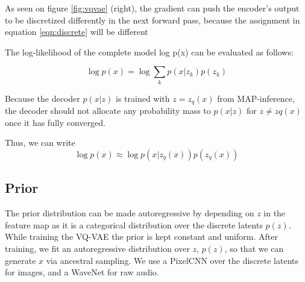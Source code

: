  As seen on figure \ref{fig:vqvae} (right), the gradient can push the encoder’s output to be discretized 
 differently in the next forward pass, because the assignment in equation \ref{eqn:discrete} will be different

 The log-likelihood of the complete model log p(x) can be evaluated as follows:

 \begin{equation}
     \log p(x) = \log \sum _k p(x|z _k) p(z _k)
     \label{eqn:modellog}
 \end{equation}

 Because the decoder $p(x|z)$ is trained with $z = z _q(x)$ from MAP-inference, the decoder
  should not allocate any probability mass to $p(x|z)$ for $z \neq zq(x)$ once it has fully converged.

  Thus, we can write
  \begin{equation}
      \log p(x) \approx \log p(x|z _q(x))p(z _q(x))
  \end{equation}

  \subsection{Prior}

  The prior distribution can be made autoregressive by depending on $z$ 
  in the feature map as it is a categorical distribution over the discrete latents $p(z)$. 
  While training the VQ-VAE the prior is kept constant and uniform. After training, we fit 
  an autoregressive distribution over $z$, $p(z)$, so that we can generate $x$ via ancestral sampling.
   We use a PixelCNN over the discrete latents for images, and a WaveNet for raw audio.









